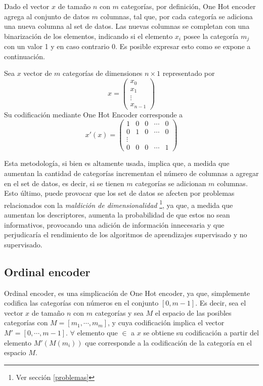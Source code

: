 Dado el vector  $x$ de tamaño $n$ con $m$ categorías, por definición, One Hot encoder agrega al conjunto de datos $m$ columnas, tal que, por cada categoría se adiciona una nueva columna al set de datos. Las nuevas columnas se completan con una binarización de los elementos, indicando si el elemento $x_{i}$ posee la categoría $m_{j}$ con un valor 1 y en caso contrario 0. Es posible expresar esto como se expone a continuación.

Sea $x$ vector de $m$ categorías de dimensiones
$n \times 1$ representado por
\[ x = \left( \begin{array}{ccc}
x_{0}\\
x_{1}\\
\vdots\\
x_{n-1} \end{array} \right)\] 
Su codificación mediante One Hot Encoder corresponde a
\[ x'(x) = \left( \begin{array}{ccccc}
1 & 0 & 0 & \cdots & 0 \\
0 & 1 & 0 & \cdots & 0 \\
\vdots\\
0 & 0 & 0 & \cdots & 1 \end{array} \right) \] 

Esta metodología, si bien es altamente usada, implica que, a medida que aumentan la cantidad de categorías incrementan el número de columnas a agregar en el set de datos, es decir, si se tienen $m$ categorías se adicionan $m$ columnas. Esto último, puede provocar que los set de datos se afecten por problemas relacionados con la \textit{maldición de dimensionalidad} \footnote{Ver sección \ref{problemas}}, ya que, a medida que aumentan los descriptores, aumenta la probabilidad de que estos no sean informativos, provocando una adición de información innecesaria y que perjudicaría el rendimiento de los algoritmos de aprendizajes supervisado y no supervisado.

\subsection{Ordinal encoder}

Ordinal encoder, es una simplicación de One Hot encoder, ya que, simplemente codifica las categorías con números en el conjunto $[0, m-1]$. Es decir, sea el vector $x$ de tamaño $n$ con $m$ categorías y sea $M$ el espacio de las posibles categorías con $M = [m_{1}, \cdots, m_{m}]$, y cuya codificación implica el vector $M' = [0, \cdots, m-1]$. $\forall $ elemento que $\in$ a $x$ se obtiene su codificación a partir del elemento $M'(M(m_{i}))$ que corresponde a la codificación de la categoría en el espacio $M$.


